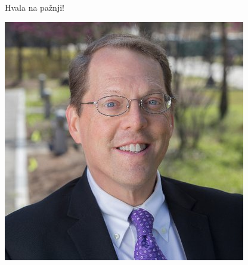 \documentclass{beamer}
\begin{document}
\begin{frame}
\frametitle{}
\begin{center}
Hvala na pažnji!
\end{center}
\begin{center}
\includegraphics[scale=0.5]{david.jpg}
\end{center}
\end{frame}
\end{document}
